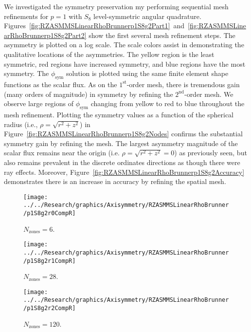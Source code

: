 \documentclass[12pt]{article}
\begin{document}
\FloatBarrier

We investigated the symmetry preservation my performing sequential mesh refinements for $p=1$ with $S_8$ level-symmetric angular quadrature. Figures~\ref{fig:RZASMMSLinearRhoBrunnerp1S8g2Part1}~and~\ref{fig:RZASMMSLinearRhoBrunnerp1S8g2Part2} show the first several mesh refinement steps. The asymmetry is plotted on a log scale. The scale colors assist in demonstrating the qualitative locations of the asymmetries. The yellow region is the least symmetric, red regions have increased symmetry, and blue regions have the most symmetry. The $\phi_\text{sym}$ solution is plotted using the same finite element shape functions as the scalar flux. As on the $1^\text{st}$-order mesh, there is tremendous gain (many orders of magnitude) in symmetry by refining the $2^\text{nd}$-order mesh. We observe large regions of $\phi_\text{sym}$ changing from yellow to red to blue throughout the mesh refinement. Plotting the symmetry values as a function of the spherical radius (i.e., $\rho=\sqrt{r^2+z^2}$) in Figure~\ref{fig:RZASMMSLinearRhoBrunnerp1S8g2Nodes} confirms the substantial symmetry gain by refining the mesh. The largest asymmetry magnitude of the scalar flux remains near the origin (i.e. $\rho=\sqrt{r^2+z^2}=0$) as previously seen, but also remains prevalent in the discrete ordinates directions as though there were ray effects. Moreover, Figure~\ref{fig:RZASMMSLinearRhoBrunnerp1S8g2Accuracy} demonstrates there is an increase in accuracy by refining the spatial mesh.

\begin{sidewaysfigure}[!htb]
\centering
\begin{subfigure}{0.33\textwidth}
\texttt{[image: ../../Research/graphics/Axisymmetry/RZASMMSLinearRhoBrunner/p1S8g2r0CompR]}
\caption{$N_\text{zones}=6$.}
\end{subfigure}%
\begin{subfigure}{0.33\textwidth}
\texttt{[image: ../../Research/graphics/Axisymmetry/RZASMMSLinearRhoBrunner/p1S8g2r1CompR]}
\caption{$N_\text{zones}=28$.}
\end{subfigure}%
\begin{subfigure}{0.33\textwidth}
\texttt{[image: ../../Research/graphics/Axisymmetry/RZASMMSLinearRhoBrunner/p1S8g2r2CompR]}
\caption{$N_\text{zones}=120$.}
\end{subfigure}
\caption{Relative asymmetry for $p=1$ finite elements on a $2^\text{nd}$-order mesh for $S_8$ level-symmetric angular quadrature.}
\label{fig:RZASMMSLinearRhoBrunnerp1S8g2Part1}
\end{sidewaysfigure}
\end{document}
